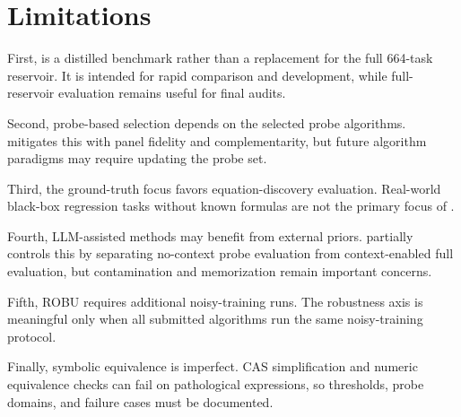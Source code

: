 \section{Limitations}

First, \core{} is a distilled benchmark rather than a replacement for the full 664-task reservoir. It is intended for rapid comparison and development, while full-reservoir evaluation remains useful for final audits.

Second, probe-based selection depends on the selected probe algorithms. \arena{} mitigates this with panel fidelity and complementarity, but future algorithm paradigms may require updating the probe set.

Third, the ground-truth focus favors equation-discovery evaluation. Real-world black-box regression tasks without known formulas are not the primary focus of \arena{}.

Fourth, LLM-assisted methods may benefit from external priors. \arena{} partially controls this by separating no-context probe evaluation from context-enabled full evaluation, but contamination and memorization remain important concerns.

Fifth, ROBU requires additional noisy-training runs. The robustness axis is meaningful only when all submitted algorithms run the same noisy-training protocol.

Finally, symbolic equivalence is imperfect. CAS simplification and numeric equivalence checks can fail on pathological expressions, so thresholds, probe domains, and failure cases must be documented.
